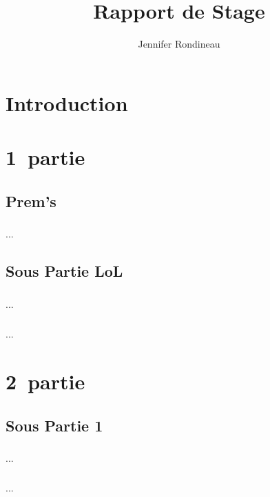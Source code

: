 \documentclass[a4paper,french,10pt]{memoir}
\title{Rapport de Stage}
\author{Jennifer Rondineau}
\begin{document}
 
\frontmatter %
\chapter{Introduction}
\paragraph{}

 
\clearpage %
\setcounter{tocdepth}{1} %
\renewcommand{\contentsname}{Sommaire} %
\tableofcontents{} %
 
\mainmatter %
\chapter{1\iere ~partie}
\section{Prem's}
\paragraph{}
...
\section{Sous Partie LoL}
\paragraph{}
...
\paragraph{}
...
 
 
\chapter{2\ieme ~partie}
\section{Sous Partie 1}
\paragraph{}
...
\paragraph{}
...
\end{document}
